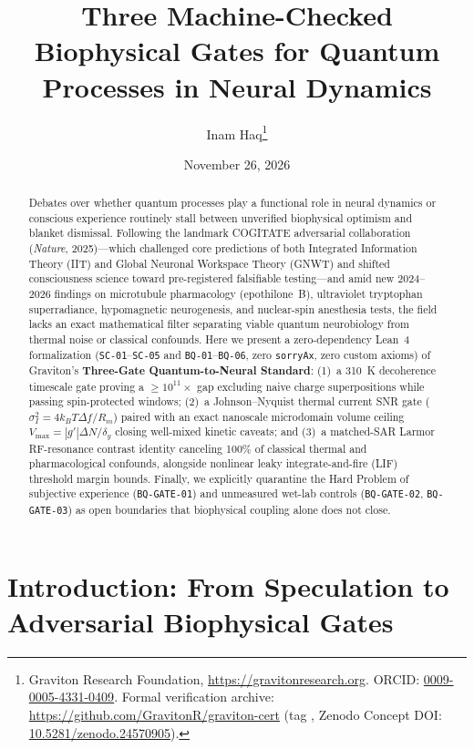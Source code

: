 \documentclass[11pt,a4paper]{article}
\title{\textbf{Three Machine-Checked Biophysical Gates for Quantum Processes in Neural Dynamics}}
\author{
  Inam Haq\thanks{Graviton Research Foundation, \url{https://gravitonresearch.org}. ORCID: \href{https://orcid.org/0009-0005-4331-0409}{0009-0005-4331-0409}. Formal verification archive: \url{https://github.com/GravitonR/graviton-cert} (tag \code{v0.8.0}, Zenodo Concept DOI: \href{https://doi.org/10.5281/zenodo.24570905}{10.5281/zenodo.24570905}).}
}
\date{November 26, 2026}
\theoremstyle{plain}
\theoremstyle{remark}
\newcommand{\code}[1]{\texttt{\small #1}}
\begin{document}
\maketitle

\begin{abstract}
Debates over whether quantum processes play a functional role in neural dynamics or conscious experience routinely stall between unverified biophysical optimism and blanket dismissal. Following the landmark COGITATE adversarial collaboration (\emph{Nature}, 2025)—which challenged core predictions of both Integrated Information Theory (IIT) and Global Neuronal Workspace Theory (GNWT) and shifted consciousness science toward pre-registered falsifiable testing—and amid new 2024--2026 findings on microtubule pharmacology (epothilone~B), ultraviolet tryptophan superradiance, hypomagnetic neurogenesis, and nuclear-spin anesthesia tests, the field lacks an exact mathematical filter separating viable quantum neurobiology from thermal noise or classical confounds. Here we present a zero-dependency Lean~4 formalization (\code{SC-01}--\code{SC-05} and \code{BQ-01}--\code{BQ-06}, zero \code{sorryAx}, zero custom axioms) of Graviton's \textbf{Three-Gate Quantum-to-Neural Standard}: (1)~a 310~K decoherence timescale gate proving a $\ge 10^{11}\times$ gap excluding naive charge superpositions while passing spin-protected windows; (2)~a Johnson--Nyquist thermal current SNR gate ($\sigma_I^2 = 4k_B T\Delta f / R_m$) paired with an exact nanoscale microdomain volume ceiling $V_{\max} = |g'|\Delta N/\delta_y$ closing well-mixed kinetic caveats; and (3)~a matched-SAR Larmor RF-resonance contrast identity canceling 100\% of classical thermal and pharmacological confounds, alongside nonlinear leaky integrate-and-fire (LIF) threshold margin bounds. Finally, we explicitly quarantine the Hard Problem of subjective experience (\code{BQ-GATE-01}) and unmeasured wet-lab controls (\code{BQ-GATE-02}, \code{BQ-GATE-03}) as open boundaries that biophysical coupling alone does not close.
\end{abstract}

\tableofcontents
\bigskip

\section{Introduction: From Speculation to Adversarial Biophysical Gates}
\end{document}
